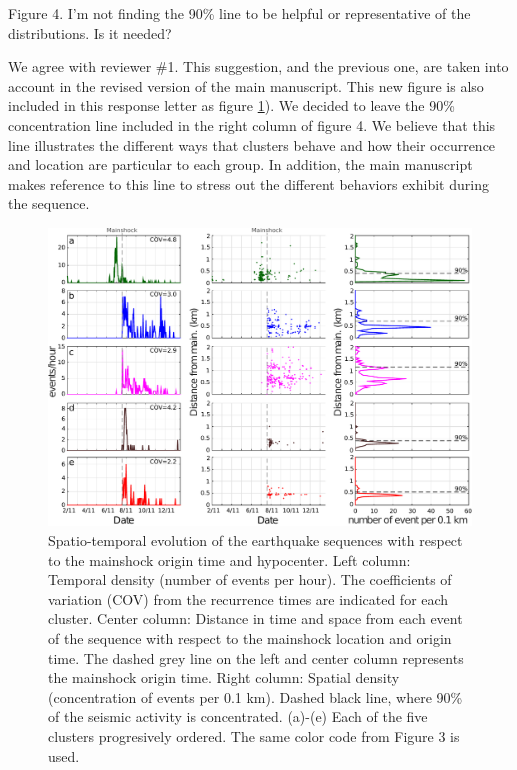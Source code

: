 \documentclass[10pt]{extarticle}
\begin{document}
\begin{ReviewerComment}{1}
\noindent 
Figure 4. I'm not finding the 90\% line to be helpful or representative of the distributions. Is it needed?
\end{ReviewerComment}


\begin{Answer}
 \WorkInProgressRevTask
We agree with reviewer \#1. This suggestion, and the previous one, are taken into account in the revised version of the main manuscript. This new figure is also included in this response letter as figure \ref{fig:new_fig_4}). We decided to leave the 90\% concentration line included in the right column of figure 4. We believe that this line illustrates the different ways that clusters behave and how their occurrence and location are particular to each group. In addition, the main manuscript makes reference to this line to stress out the different behaviors exhibit during the sequence.
\begin{figure}[!h]
\begin{center}
     \includegraphics[width=1\linewidth]{densities_plot}         \caption{Spatio-temporal evolution of the earthquake sequences with respect to the mainshock origin time and hypocenter. Left column: Temporal density (number of events per hour). The coefficients of variation (COV) from the recurrence times are indicated for each cluster. Center column: Distance in time and space from each event of the sequence with respect to the mainshock location and origin time. The dashed grey line on the left and center column represents the mainshock origin time. Right column: Spatial density (concentration of events per 0.1 km). Dashed black line, where 90\% of the seismic activity is concentrated. (a)-(e) Each of the five clusters progresively ordered. The same color code from Figure 3 is used.}
\end{center}
\label{fig:new_fig_4}
\end{figure}
\end{Answer}
%
%
\end{document}
